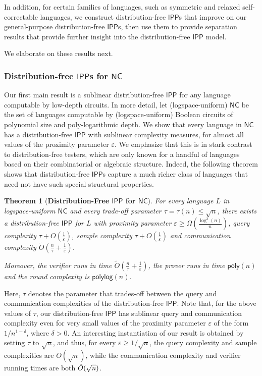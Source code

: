 \documentclass[11pt]{article}
\newtheorem{theorem}{Theorem}[section]
\newcommand{\poly}{\mathsf{poly}}
\newcommand{\polylog}{\mathsf{polylog}}
\newcommand{\NC}{\mathsf{NC}}
\newcommand{\IPP}{\mathsf{IPP}}
\newcommand{\eps}{\varepsilon}
\begin{document}
In addition, for certain families of languages, such as symmetric and relaxed self-correctable languages, we construct distribution-free $\IPP$s that improve on our general-purpose distribution-free $\IPP$s, then use them to provide separation results that provide further insight into the distribution-free $\IPP$ model.

We elaborate on these results next.

\subsubsection{Distribution-free $\IPP$s for $\NC$}
Our first main result is a sublinear distribution-free $\IPP$ for any language computable by low-depth circuits. In more detail, let (logspace-uniform) $\NC$ be the set of languages computable by (logspace-uniform) Boolean circuits of polynomial size and poly-logarithmic depth. We show that every language in $\NC$ has a distribution-free $\IPP$ with sublinear complexity measures, for almost all values of the proximity parameter $\varepsilon$. We emphasize that this is in stark contrast to distribution-free testers, which are only known for a handful of languages based on their combinatorial or algebraic structure. Indeed, the following theorem shows that distribution-free $\IPP$s capture a much richer class of languages that need not have such special structural properties.

\begin{theorem}[\textbf{Distribution-Free $\IPP$ for $\NC$}]
    \label{thm:informal_dfipp_nc}
    For every language $L$ in logspace-uniform $\NC$ and every trade-off parameter $\tau=\tau(n) \leq \sqrt{n}$, there exists a distribution-free $\IPP$ for $L$ with proximity parameter $\varepsilon\geq \Omega\left(\frac{\log^3 (n)}{n}\right)$, query complexity $\tau+O\left(\frac{1}{\eps}\right)$, sample complexity $\tau+O\left(\frac{1}{\eps}\right)$ and communication complexity $\tilde{O}\left(\frac{n}{\tau}+\frac{1}{\eps}\right)$. 
    
    Moreover, the verifier runs in time $\tilde{O}\left(\frac{n}{\tau} +\frac{1}{\eps}\right)$, the prover runs in time $\poly(n)$ and the round complexity is $\polylog(n)$.
\end{theorem}

Here, $\tau$ denotes the parameter that trades-off between the query and communication complexities of the distribution-free $\IPP$. Note that, for the above values of $\tau$, our distribution-free $\IPP$ has sublinear query and communication complexity even for very small values of the proximity parameter $\varepsilon$ of the form $1/n^{1-\delta}$, where $\delta > 0$. An interesting instantiation of our result is obtained by setting $\tau$ to $\sqrt{n}$, and thus, for every $\eps \geq 1/\sqrt{n}$, the query complexity and sample complexities are $O(\sqrt{n})$, while the communication complexity and verifier running times are both $\Tilde{O}(\sqrt{n})$. 
\end{document}
